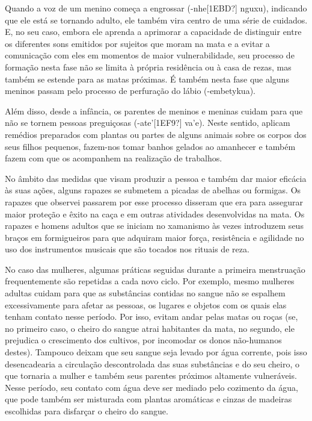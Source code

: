 \documentclass{article}
\begin{document}
Quando a voz de um menino come\c{c}a a engrossar
(-nhe{\textquotesingle}[1EBD?] nguxu), indicando que ele est\'a se
tornando adulto, ele tamb\'em vira centro de uma s\'erie de cuidados.
E, no seu caso, embora ele aprenda a aprimorar a capacidade de
distinguir entre os diferentes sons emitidos por sujeitos que moram na
mata e a evitar a comunica\c{c}\~ao com eles em momentos de maior
vulnerabilidade, seu processo de forma\c{c}\~ao nesta fase n\~ao se
limita \`a pr\'opria resid\^encia ou \`a casa de rezas, mas tamb\'em se
estende para as matas pr\'oximas. \'E tamb\'em nesta fase que alguns
meninos passam pelo processo de perfura\c{c}\~ao do l\'abio
({}-embetykua). 

Al\'em disso, desde a inf\^ancia, os parentes de meninos e meninas
cuidam para que n\~ao se tornem pessoas pregui\c{c}osas
({}-ate{\textquoteright}[1EF9?] va{\textquoteright}e). Neste sentido,
aplicam rem\'edios preparados com plantas ou partes de alguns animais
sobre os corpos dos seus filhos pequenos, fazem-nos tomar banhos
gelados ao amanhecer e tamb\'em fazem com que os acompanhem na
realiza\c{c}\~ao de trabalhos.

No \^ambito das medidas que visam produzir a pessoa e tamb\'em dar maior
efic\'acia \`as suas a\c{c}\~oes, alguns rapazes se submetem a picadas
de abelhas ou formigas. Os rapazes que observei passarem por esse
processo disseram que era para assegurar maior prote\c{c}\~ao e \^exito
na ca\c{c}a e em outras atividades desenvolvidas na mata. Os rapazes e
homens adultos que se iniciam no xamanismo \`as vezes introduzem seus
bra\c{c}os em formigueiros para que adquiram maior for\c{c}a,
resist\^encia e agilidade no uso dos instrumentos musicais que s\~ao
tocados nos rituais de reza. 

No caso das mulheres, algumas pr\'aticas seguidas durante a primeira
menstrua\c{c}\~ao frequentemente s\~ao repetidas a cada novo ciclo. Por
exemplo, mesmo mulheres adultas cuidam para que as subst\^ancias
contidas no sangue n\~ao se espalhem excessivamente para afetar as
pessoas, os lugares e objetos com os quais elas tenham contato nesse
per\'iodo. Por isso, evitam andar pelas matas ou ro\c{c}as (se, no
primeiro caso, o cheiro do sangue atrai habitantes da mata, no segundo,
ele prejudica o crescimento dos cultivos, por incomodar os donos
n\~ao-humanos destes). Tampouco deixam que seu sangue seja levado por
\'agua corrente, pois isso desencadearia a circula\c{c}\~ao
descontrolada das suas subst\^ancias e do seu cheiro, o que tornaria a
mulher e tamb\'em seus parentes pr\'oximos altamente vulner\'aveis.
Nesse per\'iodo, seu contato com \'agua deve ser mediado pelo cozimento
da \'agua, que pode tamb\'em ser misturada com plantas arom\'aticas e
cinzas de madeiras escolhidas para disfar\c{c}ar o cheiro do sangue.
\end{document}
